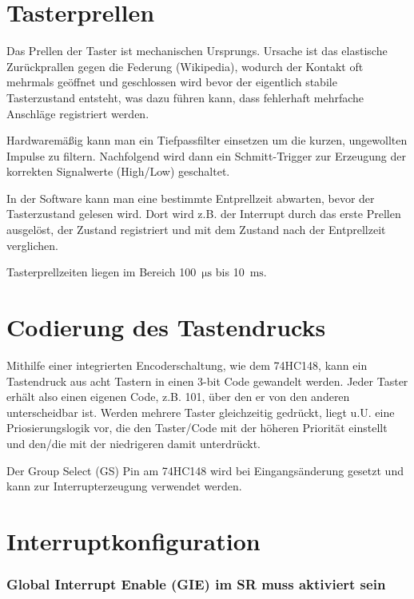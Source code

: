 \documentclass[a4paper, 12pt]{article}
\begin{document}
  
  \clearpage
  \setcounter{page}{1}
\section{Tasterprellen}
Das Prellen der Taster ist mechanischen Ursprungs. Ursache ist das elastische
Zurückprallen gegen die Federung (Wikipedia), wodurch der Kontakt oft mehrmals
geöffnet und geschlossen wird bevor der eigentlich stabile Tasterzustand
entsteht, was dazu führen kann, dass fehlerhaft mehrfache Anschläge
registriert werden.

Hardwaremäßig kann man ein Tiefpassfilter einsetzen um die kurzen,
ungewollten Impulse zu filtern. Nachfolgend wird dann ein Schmitt-Trigger zur
Erzeugung der korrekten Signalwerte (High/Low) geschaltet.

In der Software kann man eine bestimmte Entprellzeit abwarten, bevor der
Tasterzustand gelesen wird. Dort wird z.B. der Interrupt durch das erste Prellen
ausgelöst, der Zustand registriert und mit dem Zustand nach der Entprellzeit verglichen.

Tasterprellzeiten liegen im Bereich 100 $\, \si{\micro\second}$ bis 10 $\, \si{\milli\second}$.

\section{Codierung des Tastendrucks}
Mithilfe einer integrierten Encoderschaltung, wie dem 74HC148, kann ein Tastendruck
aus acht Tastern in einen 3-bit Code gewandelt werden. Jeder Taster erhält also
einen eigenen Code, z.B. 101, über den er von den anderen unterscheidbar ist.
Werden mehrere Taster gleichzeitig gedrückt, liegt u.U. eine Priosierungslogik
vor, die den Taster/Code mit der höheren Priorität einstellt und den/die mit der
niedrigeren damit unterdrückt.

Der Group Select (GS) Pin am 74HC148 wird bei Eingangsänderung gesetzt und kann
zur Interrupterzeugung verwendet werden.

\section{Interruptkonfiguration}

\subsubsection*{Global Interrupt Enable (GIE) im SR muss aktiviert sein}
\end{document}
